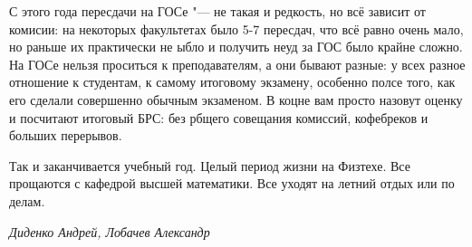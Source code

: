 С этого года пересдачи на ГОСе "--- не такая и редкость, но всё зависит от комисии: на некоторых факультетах было 5-7 пересдач, что всё равно очень мало, но раньше их практически не ыбло и получить неуд за ГОС было крайне сложно.
На ГОСе нельзя проситься к преподавателям, а они бывают разные: у всех разное отношение к студентам, к самому итоговому экзамену, особенно полсе того, как его сделали совершенно обычным экзаменом. В коцне вам просто назовут оценку и посчитают итоговый БРС: без рбщего совещания комиссий, кофебреков и больших перерывов.

Так и заканчивается учебный год. Целый период жизни на Физтехе. Все прощаются с кафедрой высшей математики. Все уходят на летний отдых или по делам.

\mbox{}

\noindent\textit{Диденко Андрей, Лобачев Александр}


